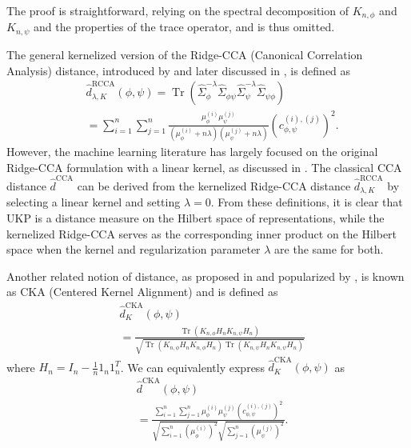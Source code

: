 \documentclass{article}
\theoremstyle{plain}
\newcommand{\repone}{\phi}
\newcommand{\reptwo}{\psi}
\DeclareMathOperator*{\Tr}{\text{Tr}}
\newcommand{\metricstname}{UKP }
\begin{document}
The proof is straightforward, relying on the spectral decomposition of $K_{n,\repone}$ and $K_{n,\reptwo}$ and the properties of the trace operator, and is thus omitted.

The general kernelized version of the Ridge-CCA (Canonical Correlation Analysis) distance, introduced by \citet{vinod1976canonical} and later discussed in \citet{kuss2003geometry}, is defined as
\[
\begin{aligned}
 &\hat{d}^{\text{RCCA}}_{\lambda,K}(\repone,\reptwo) = \Tr\left(\hat{\Sigma}_{\repone}^{-\lambda}\hat{\Sigma}_{\repone\reptwo}\hat{\Sigma}_{\reptwo}^{-\lambda}\hat{\Sigma}_{\reptwo\repone}\right) \\
    &= \sum_{i=1}^{n}\sum_{j=1}^{n}\frac{\mu_{\repone}^{(i)}\mu_{\reptwo}^{(j)}}{\left(\mu_{\repone}^{(i)} + n\lambda\right)\left(\mu_{\reptwo}^{(j)} + n\lambda\right)}\left(c_{\repone,\reptwo}^{(i),(j)} \right)^{2}.
\end{aligned}
\]
However, the machine learning literature has largely focused on the original Ridge-CCA formulation with a linear kernel, as discussed in \citet{kornblith2019similarity}. The classical CCA distance $\hat{d}^{\text{CCA}}$ can be derived from the kernelized Ridge-CCA distance $\hat{d}^{\text{RCCA}}_{\lambda,K}$ by selecting a linear kernel and setting $\lambda=0$. From these definitions, it is clear that \metricstname is a distance measure on the Hilbert space of representations, while the kernelized Ridge-CCA serves as the corresponding inner product on the Hilbert space when the kernel and regularization parameter $\lambda$ are the same for both.

Another related notion of distance, as proposed in \citet{cristianini2001kernel} and popularized  by \citet{kornblith2019similarity}, is known as CKA (Centered Kernel Alignment) and is defined as 
\[
\begin{aligned}
    &\hat{d}_{K}^{\text{CKA}}(\repone,\reptwo) \\
    &= \frac{\Tr\left(K_{n,\repone}H_{n}K_{n,\reptwo}H_{n}\right)}{\sqrt{\Tr\left(K_{n,\repone}H_{n}K_{n,\repone}H_{n}\right) \Tr\left(K_{n,\reptwo}H_{n}K_{n,\reptwo}H_{n}\right)}}
\end{aligned}
\]
where $H_{n} = I_{n} - \frac{1}{n}1_{n}1_{n}^{T}$. We can equivalently express $\hat{d}_{K}^{\text{CKA}}(\repone,\reptwo) $ as 
\[
\begin{aligned}
    &\hat{d}^{\text{CKA}}(\repone,\reptwo) \\
    &= \frac{\sum_{i=1}^{n}\sum_{j=1}^{n}\mu_{\repone}^{(i)}\mu_{\reptwo}^{(j)}\left(c_{\repone,\reptwo}^{(i),(j)} \right)^{2}}{\sqrt{\sum_{i=1}^{n} \left(\mu_{\repone}^{(i)}\right)^{2}}\sqrt{\sum_{j=1}^{n} \left(\mu_{\reptwo}^{(j)}\right)^{2}}}.
\end{aligned}
\]
\end{document}
